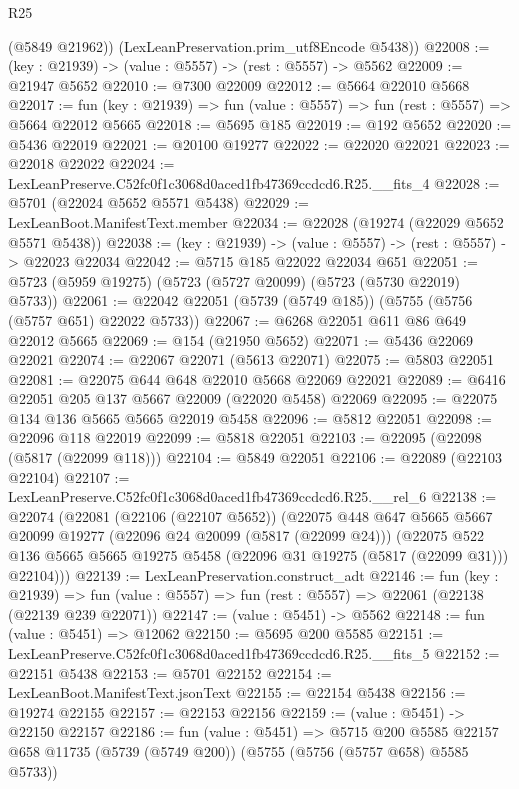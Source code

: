 \begin{lexlean}{R25}
\begin{coremodule}
        (@5849 @21962))
      (LexLeanPreservation.prim_utf8Encode @5438))
@22008 := (key : @21939) -> (value : @5557) -> (rest : @5557) -> @5562
@22009 := @21947 @5652
@22010 := @7300 @22009
@22012 := @5664 @22010 @5668
@22017 := fun (key : @21939) => fun (value : @5557) => fun (rest : @5557) => @5664 @22012 @5665
@22018 := @5695 @185
@22019 := @192 @5652
@22020 := @5436 @22019
@22021 := @20100 @19277
@22022 := @22020 @22021
@22023 := @22018 @22022
@22024 := LexLeanPreserve.C52fc0f1c3068d0aced1fb47369ccdcd6.R25.__fits_4
@22028 := @5701 (@22024 @5652 @5571 @5438)
@22029 := LexLeanBoot.ManifestText.member
@22034 := @22028 (@19274 (@22029 @5652 @5571 @5438))
@22038 := (key : @21939) -> (value : @5557) -> (rest : @5557) -> @22023 @22034
@22042 := @5715 @185 @22022 @22034 @651
@22051 := @5723 (@5959 @19275) (@5723 (@5727 @20099) (@5723 (@5730 @22019) @5733))
@22061 := @22042 @22051 (@5739 (@5749 @185)) (@5755 (@5756 (@5757 @651) @22022 @5733))
@22067 := @6268 @22051 @611 @86 @649 @22012 @5665
@22069 := @154 (@21950 @5652)
@22071 := @5436 @22069 @22021
@22074 := @22067 @22071 (@5613 @22071)
@22075 := @5803 @22051
@22081 := @22075 @644 @648 @22010 @5668 @22069 @22021
@22089 := @6416 @22051 @205 @137 @5667 @22009 (@22020 @5458) @22069
@22095 := @22075 @134 @136 @5665 @5665 @22019 @5458
@22096 := @5812 @22051
@22098 := @22096 @118 @22019
@22099 := @5818 @22051
@22103 := @22095 (@22098 (@5817 (@22099 @118)))
@22104 := @5849 @22051
@22106 := @22089 (@22103 @22104)
@22107 := LexLeanPreserve.C52fc0f1c3068d0aced1fb47369ccdcd6.R25.__rel_6
@22138 := @22074
    (@22081
      (@22106 (@22107 @5652))
      (@22075
        @448
        @647
        @5665
        @5667
        @20099
        @19277
        (@22096 @24 @20099 (@5817 (@22099 @24)))
        (@22075
          @522
          @136
          @5665
          @5665
          @19275
          @5458
          (@22096 @31 @19275 (@5817 (@22099 @31)))
          @22104)))
@22139 := LexLeanPreservation.construct_adt
@22146 := fun (key : @21939) =>
  fun (value : @5557) => fun (rest : @5557) => @22061 (@22138 (@22139 @239 @22071))
@22147 := (value : @5451) -> @5562
@22148 := fun (value : @5451) => @12062
@22150 := @5695 @200 @5585
@22151 := LexLeanPreserve.C52fc0f1c3068d0aced1fb47369ccdcd6.R25.__fits_5
@22152 := @22151 @5438
@22153 := @5701 @22152
@22154 := LexLeanBoot.ManifestText.jsonText
@22155 := @22154 @5438
@22156 := @19274 @22155
@22157 := @22153 @22156
@22159 := (value : @5451) -> @22150 @22157
@22186 := fun (value : @5451) =>
  @5715
    @200
    @5585
    @22157
    @658
    @11735
    (@5739 (@5749 @200))
    (@5755 (@5756 (@5757 @658) @5585 @5733))

\end{coremodule}
\end{lexlean}
